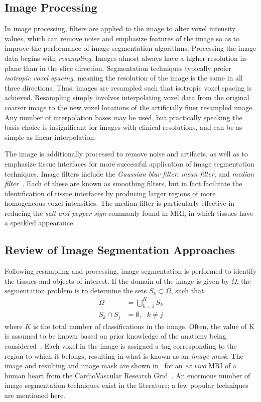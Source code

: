 \subsection{Image Processing}
\label{Image Processing}
In image processing, filters are applied to the image to alter voxel intensity values, which can remove noise and emphasize features of the image so as to improve the performance of image segmentation algorithms. Processing the image data begins with \textit{resampling}. Images almost always have a higher resolution in-plane than in the slice direction. Segmentation techniques typically prefer \textit{isotropic voxel spacing}, meaning the resolution of the image is the same in all three directions. Thus, images are resampled such that isotropic voxel spacing is achieved. Resampling simply involves interpolating voxel data from the original coarser image to the new voxel locations of the artificially finer resampled image. Any number of interpolation bases may be used, but practically speaking the basis choice is insignificant for images with clinical resolutions, and can be as simple as linear interpolation.

The image is additionally processed to remove noise and artifacts, as well as to emphasize tissue interfaces for more successful application of image segmentation techniques. Image filters include the \textit{Gaussian blur filter}, \textit{mean filter}, and \textit{median filter}~\cite{Seg3D}. Each of these are known as smoothing filters, but in fact facilitate the identification of tissue interfaces by producing larger regions of more homogeneous voxel intensities. The median filter is particularly effective in reducing the \textit{salt and pepper sign} commonly found in MRI, in which tissues have a speckled appearance.

\subsection{Review of Image Segmentation Approaches}
\label{Review of Image Segmentation Approaches}

Following resampling and processing, image segmentation is performed to identify the tissues and objects of interest. If the domain of the image is given by $\Omega$, the segmentation problem is to determine the sets $S_k \subset \Omega$, such that:
\begin{align}
\Omega &= \bigcup \limits_{k=1}^{K} S_k \\
S_k \cap S_j &= \emptyset, \text{\ \ } k \neq j
\end{align}
where $K$ is the total number of classifications in the image. Often, the value of K is assumed to be known based on prior knowledge of the anatomy being considered~\cite{pham_2000}. Each voxel in the image is assigned a tag corresponding to the region to which it belongs, resulting in what is known as an \textit{image mask}. The image and resulting and image mask are shown in~ for an \textit{ex vivo} MRI of a human heart from the CardioVascular Research Grid~\cite{cvgg}. An enormous number of image segmentation techniques exist in the literature; a few popular techniques are mentioned here.

